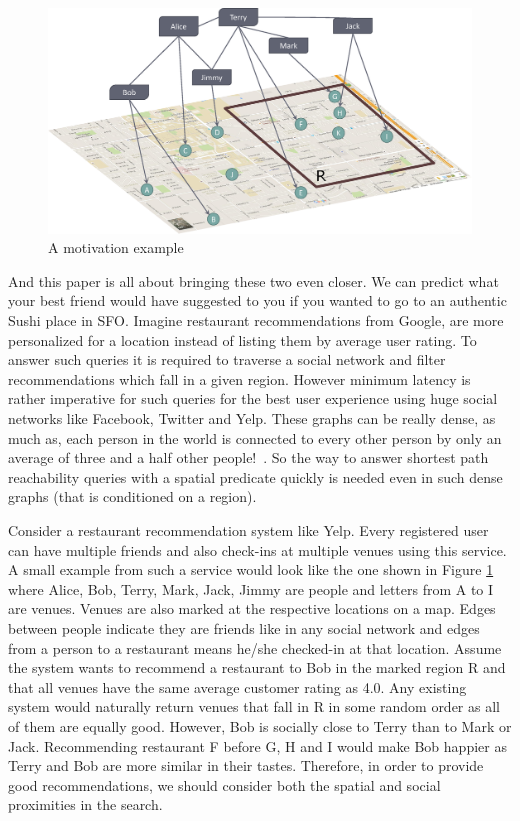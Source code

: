 \begin{figure}[t]
	\centering
	\includegraphics[width=0.88\linewidth]{images/a_motivation_example.eps}
	\caption{A motivation example}
	\label{fig:begin-example}
\end{figure}

And this paper is all about bringing these two even closer. We can predict what your best friend would have suggested to you if you wanted to go to an authentic Sushi place in SFO. Imagine restaurant recommendations from Google, are more personalized for a location instead of listing them by average user rating. To answer such queries it is required to traverse a social network and filter recommendations which fall in a given region. However minimum latency is rather imperative for such queries for the best user experience using huge social networks like Facebook, Twitter and Yelp. These graphs can be really dense, as much as, each person in the world is connected to every other person by only an average of three and a half other people!~\cite{Taa}. So the way to answer shortest path reachability queries with a spatial predicate quickly is needed even in such dense graphs (that is conditioned on a region).

Consider a restaurant recommendation system like Yelp. Every registered user can have multiple friends and also check-ins at multiple venues using this service. A small example from such a service would look like the one shown in Figure \ref{fig:begin-example} where Alice, Bob, Terry, Mark, Jack, Jimmy are people and letters from A to I are venues. Venues are also marked at the respective locations on a map. Edges between people indicate they are friends like in any social network and edges from a person to a restaurant means he/she checked-in at that location. Assume the system wants to recommend a restaurant to Bob in the marked region R and that all venues have the same average customer rating as 4.0. Any existing system would naturally return venues that fall in R in some random order as all of them are equally good. However, Bob is socially close to Terry than to Mark or Jack. Recommending restaurant F before G, H and I would make Bob happier as Terry and Bob are more similar in their tastes. Therefore, in order to provide good recommendations, we should consider both the spatial and social proximities in the search.

